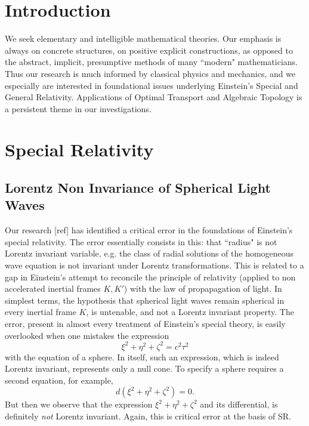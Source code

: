 \documentclass[12pt]{amsart}
\theoremstyle{definition}
\theoremstyle{remark}
\begin{document}
\title{}


\author{J. H. Martel}
\date{\today}
\maketitle

\begin{abstract}

\end{abstract}

\tableofcontents

\section{Introduction}
We seek elementary and intelligible mathematical theories. Our emphasis is always on concrete structures, on positive explicit constructions, as opposed to the abstract, implicit, presumptive methods of many ``modern" mathematicians. Thus our research is much informed by classical physics and mechanics, and we especially are interested in foundational issues underlying Einstein's Special and General Relativity. Applications of Optimal Transport and Algebraic Topology is a persistent theme in our investigations.

\section{Special Relativity}
\subsection{Lorentz Non Invariance of Spherical Light Waves}
Our research [ref] has identified a critical error in the foundations of Einstein's special relativity. The error essentially consists in this: that ``radius" is not Lorentz invariant variable, e.g. the class of radial solutions of the homogeneous wave equation is not invariant under Lorentz transformations. This is related to a gap in Einstein's attempt to reconcile the principle of relativity (applied to non accelerated inertial frames $K, K'$) with the law of propapagation of light. In simplest terms, the hypothesis that spherical light waves remain spherical in every inertial frame $K$, is untenable, and not a Lorentz invariant property. The error, present in almost every treatment of Einstein's special theory, is easily overlooked when one mistakes the expression $$\xi^2+\eta^2+\zeta^2=c^2 \tau^2$$ with the equation of a sphere. In itself, such an expression, which is indeed Lorentz invariant, represents only a null cone. To specify a sphere requires a second equation, for example, $$d(\xi^2+\eta^2+\zeta^2)=0.$$ But then we observe that the expression $\xi^2+\eta^2+\zeta^2$ and its differential, is definitely \emph{not} Lorentz invariant. Again, this is critical error at the basis of SR.
\end{document}
